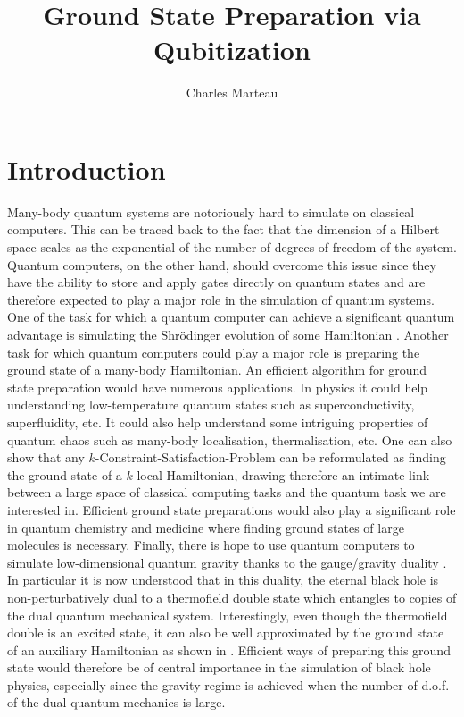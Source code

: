\documentclass[a4paper,11pt]{article}
\title{\boldmath Ground State Preparation via Qubitization}
\author{Charles Marteau}
\affiliation{Department of Physics and Astronomy \\
University of British Columbia \\
Vancouver, BC V6T 1Z1, Canada
}
\begin{document}
\maketitle
\flushbottom

\section{Introduction}
\label{sec:intro}

Many-body quantum systems are notoriously hard to simulate on classical computers. This can be traced back to the fact that the dimension of a Hilbert space scales as the exponential of the number of degrees of freedom of the system. Quantum computers, on the other hand, should overcome this issue since they have the ability to store and apply gates directly on quantum states and are therefore expected to play a major role in the simulation of quantum systems. One of the task for which a quantum computer can achieve a significant quantum advantage is simulating the Shr\"odinger  evolution of some Hamiltonian \cite{feynman1982simulating, 
doi:10.1126/science.273.5278.1073, PhysRevLett.114.090502, Berry2015HamiltonianSW, PhysRevLett.118.010501, Low2019hamiltonian}. Another task for which quantum computers could play a major role is preparing the ground state of a many-body Hamiltonian. An efficient algorithm for ground state preparation would have numerous applications. In physics it could help understanding low-temperature quantum states such as superconductivity, superfluidity, etc. It could also help understand some intriguing properties of quantum chaos such as many-body localisation, thermalisation, etc. One can also show that any $k$-Constraint-Satisfaction-Problem can be reformulated as finding the ground state of a $k$-local Hamiltonian, drawing therefore an intimate link between a large space of classical computing tasks and the quantum task we are interested in. Efficient ground state preparations would also play a significant role in quantum chemistry and medicine where finding ground states of large molecules is necessary. Finally, there is hope to use quantum computers to simulate low-dimensional quantum gravity thanks to the gauge/gravity duality \cite{brown2021quantum}. In particular it is now understood that in this duality, the eternal black hole is non-perturbatively dual to a thermofield double state \cite{Maldacena_2003} which entangles to copies of the dual quantum mechanical system. Interestingly, even though the thermofield double is an excited state, it can also be well approximated by the ground state of an auxiliary Hamiltonian as shown in \cite{Cottrell:2018ash}. Efficient ways of preparing this ground state would therefore be of central importance in the simulation of black hole physics, especially since the gravity regime is achieved when the number of d.o.f. of the dual quantum mechanics is large.
\end{document}

